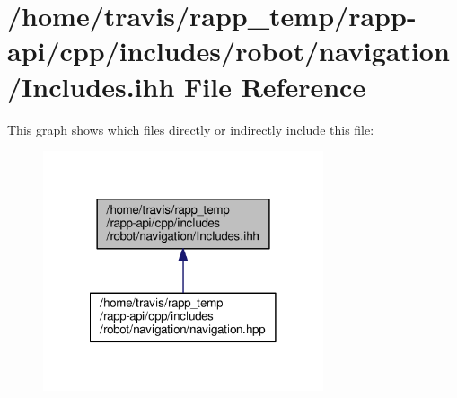 \hypertarget{robot_2navigation_2Includes_8ihh}{\section{/home/travis/rapp\-\_\-temp/rapp-\/api/cpp/includes/robot/navigation/\-Includes.ihh File Reference}
\label{robot_2navigation_2Includes_8ihh}
}
This graph shows which files directly or indirectly include this file\-:
\nopagebreak
\begin{figure}[H]
\begin{center}
\leavevmode
\includegraphics[width=234pt]{robot_2navigation_2Includes_8ihh__dep__incl}
\end{center}
\end{figure}
